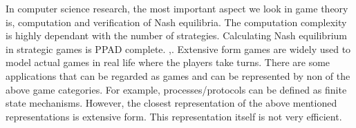 In computer science research, the most important aspect we look in game theory is, computation and verification of Nash equilibria. The computation complexity is highly dependant with the number of strategies. Calculating Nash equilibrium in strategic games is PPAD complete. \cite{DGP09},\cite{CD06}. \newline
Extensive form games are widely used to model actual games in real life where the players take turns. There are some applications that can be regarded as games and can be represented by non of the above game categories. For example, processes/protocols can be defined as finite state mechanisms. However, the closest representation of the above mentioned representations is extensive form. This representation itself is not very efficient. 

%
%
%
%
